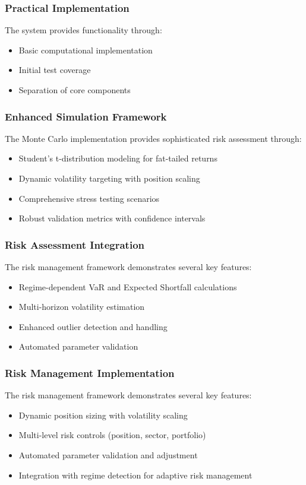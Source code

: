\subsubsection{Practical Implementation}
The system provides functionality through:
\begin{itemize}
    \item Basic computational implementation
    \item Initial test coverage
    \item Separation of core components
\end{itemize}

\subsubsection{Enhanced Simulation Framework}
The Monte Carlo implementation provides sophisticated risk assessment through:
\begin{itemize}
    \item Student's t-distribution modeling for fat-tailed returns
    \item Dynamic volatility targeting with position scaling
    \item Comprehensive stress testing scenarios
    \item Robust validation metrics with confidence intervals
\end{itemize}

\subsubsection{Risk Assessment Integration}
The risk management framework demonstrates several key features:
\begin{itemize}
    \item Regime-dependent VaR and Expected Shortfall calculations
    \item Multi-horizon volatility estimation
    \item Enhanced outlier detection and handling
    \item Automated parameter validation
\end{itemize}

\subsubsection{Risk Management Implementation}
The risk management framework demonstrates several key features:
\begin{itemize}
    \item Dynamic position sizing with volatility scaling
    \item Multi-level risk controls (position, sector, portfolio)
    \item Automated parameter validation and adjustment
    \item Integration with regime detection for adaptive risk management
\end{itemize}

